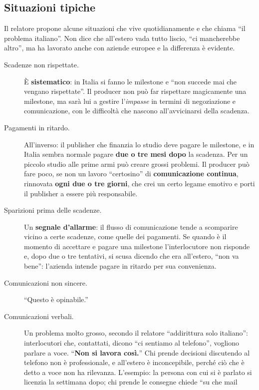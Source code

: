 \subsection{Situazioni tipiche}

Il relatore propone alcune situazioni che vive quotidianamente e che chiama ``il
problema italiano''. Non dice che all'estero vada tutto liscio, ``ci mancherebbe
altro'', ma ha lavorato anche con aziende europee e la differenza è evidente.
\begin{description}
  \item[Scadenze non rispettate.] È \textbf{sistematico}: in Italia si fanno le
        milestone e ``non succede mai che vengano rispettate''. Il producer non
        può far rispettare magicamente una milestone, ma sarà lui a gestire
        l'\emph{impasse} in termini di negoziazione e comunicazione, con le
        difficoltà che nascono all'avvicinarsi della scadenza.
  \item[Pagamenti in ritardo.] All'inverso: il publisher che finanzia lo studio
        deve pagare le milestone, e in Italia sembra normale pagare \textbf{due o
        tre mesi dopo} la scadenza. Per un piccolo studio alle prime armi può
        creare grossi problemi. Il producer può fare poco, se non un lavoro
        ``certosino'' di \textbf{comunicazione continua}, rinnovata \textbf{ogni
        due o tre giorni}, che crei un certo legame emotivo e porti il publisher
        a essere più responsabile.
  \item[Sparizioni prima delle scadenze.] Un \textbf{segnale d'allarme}: il
        flusso di comunicazione tende a scomparire vicino a certe scadenze, come
        quelle dei pagamenti. Se quando è il momento di accettare e pagare una
        milestone l'interlocutore non risponde e, dopo due o tre tentativi, si
        scusa dicendo che era all'estero, ``non va bene'': l'azienda intende
        pagare in ritardo per sua convenienza.
  \item[Comunicazioni non sincere.] ``Questo è opinabile.''
  \item[Comunicazioni verbali.] Un problema molto grosso, secondo il relatore
        ``addirittura solo italiano'': interlocutori che, contattati, dicono ``ci
        sentiamo al telefono'', vogliono parlare a voce. ``\textbf{Non si lavora
        così.}'' Chi prende decisioni discutendo al telefono non è
        professionale, e all'estero è inconcepibile, perché ciò che è detto a
        voce non ha rilevanza. L'esempio: la persona con cui si è parlato si
        licenzia la settimana dopo; chi prende le consegne chiede ``su che mail

\end{description}
